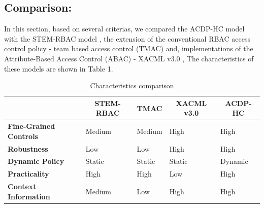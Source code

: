 \subsection{Comparison: }

In this section, based on several criterias, we compared the ACDP-HC model with the STEM-RBAC model \cite{georgakakis2011spatio}, the extension of the conventional RBAC access control policy - team based access control (TMAC) \cite{georgiadis2001flexible} %
and, implementations of the Attribute-Based Access Control (ABAC) - XACML v3.0 \cite{rissanen2013extensible}, %
The characteristics of these models are shown in Table 1.

\begin{table}[]
\centering
\caption{Characteristics comparison}
\label{comparision}
\begin{tabular}{|l|l|l|l|l|}
\hline
                                      & \multicolumn{1}{c|}{\textbf{STEM-RBAC}} & \multicolumn{1}{c|}{\textbf{TMAC}} & \multicolumn{1}{c|}{\textbf{XACML v3.0}} & \multicolumn{1}{c|}{\textbf{ACDP-HC}} \\ \hline
\textbf{Fine-Grained Controls} & Medium                                  & Medium                             & High                                     & High                                \\ \hline
\textbf{Robustness}                   & Low                                     & Low                                & High                                     & High                                \\ \hline
\textbf{Dynamic Policy}               & Static                                  & Static                             & Static                                   & Dynamic                             \\ \hline
\textbf{Practicality}                 & High                                    & High                               & Low                                      & High                                \\ \hline
\textbf{Context Information}          & Medium                                  & Low                                & High                                     & High                                \\ \hline
\end{tabular}
\end{table}

